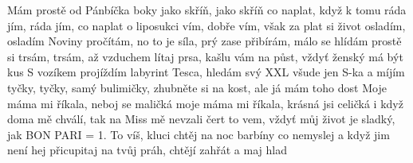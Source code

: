 \ve{}
Mám prostě od Pánbíčka
boky jako skříň, jako skříň
co naplat, když k tomu ráda jím, ráda jím, co naplat
o liposukci vím, dobře vím,
však za plat si život osladím, osladím
\ve{}
Noviny pročítám, no to je síla,
prý zase přibírám, málo se hlídám
prostě si trsám, trsám,
až vzduchem lítaj prsa,
kašlu vám na půst,
vždyť ženský má být kus
\ve{}
S vozíkem projíždím labyrint Tesca,
hledám svý XXL
všude jen S-ka
a míjím tyčky, tyčky, samý bulimičky,
zhubněte si na kost,
ale já mám toho dost
\cho{}
Moje máma mi říkala,
neboj se maličká
moje máma mi říkala,
krásná jsi celičká
i když doma mě chválí,
tak na Miss mě nevzali
čert to vem,
vždyť můj život je sladký, jak BON PARI
\ve{}
= 1.
\ve{}
To víš, kluci chtěj
na noc barbíny co nemyslej
a když jim není hej
přicupitaj na tvůj práh,
chtějí zahřát a maj hlad
\cho{}
\esong{}